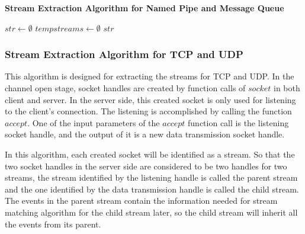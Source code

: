 \begin{algorithm}[H]
\DontPrintSemicolon
\caption{{\bf Stream Extraction Algorithm for Named Pipe and Message Queue} \label{streamext1}}
$str \leftarrow \emptyset$\; 
$tempstreams \leftarrow \emptyset$\;
\KwRet $str$\;
\end{algorithm} 

\subsubsection{Stream Extraction Algorithm for TCP and UDP}
This algorithm is designed for extracting the streams for TCP and UDP. In the channel open stage, socket handles are created by function calls of $socket$ in both client and server. In the server side, this created socket is only used for listening to the client's connection. The listening is accomplished by calling the function $accept$. One of the input parameters of the $accept$ function call is the listening socket handle, and the output of it is a new data transmission socket handle. 


In this algorithm, each created socket will be identified as a stream. So that the two socket handles in the server side are considered to be two handles for two streams, the stream identified by the listening handle is called the parent stream and the one identified by the data transmission handle is called the child stream. The events in the parent stream contain the information needed for stream matching algorithm for the child stream later, so the child stream will inherit all the events from its parent. 

